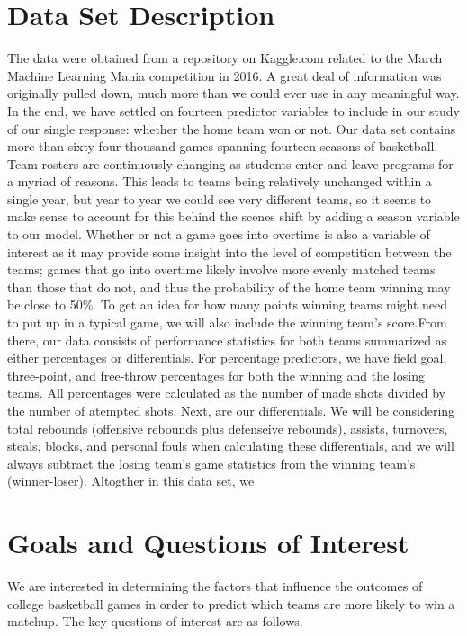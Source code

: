 \documentclass[12pt]{article}\usepackage[]{graphicx}\usepackage[]{color}
\begin{document}
\section{Data Set Description}
The data were obtained from a repository on Kaggle.com related to the March Machine Learning Mania competition in 2016. A great deal of information was originally pulled down, much more than we could ever use in any meaningful way. In the end, we have settled on fourteen predictor variables to include in our study of our single response: whether the home team won or not. Our data set contains more than sixty-four thousand games spanning fourteen seasons of basketball. Team rosters are continuously changing as students enter and leave programs for a myriad of reasons. This leads to teams being relatively unchanged within a single year, but year to year we could see very different teams, so it seems to make sense to account for this behind the scenes shift by adding a season variable to our model. Whether or not a game goes into overtime is also a variable of interest as it may provide some insight into the level of competition between the teams; games that go into overtime likely involve more evenly matched teams than those that do not, and thus the probability of the home team winning may be close to 50\%. To get an idea for how many points winning teams might need to put up in a typical game, we will also include the winning team's score.From there, our data consists of performance statistics for both teams summarized as either percentages or differentials. For percentage predictors, we have field goal, three-point, and free-throw percentages for both the winning and the losing teams. All percentages were calculated as the number of made shots divided by the number of atempted shots. Next, are our differentials. We will be considering total rebounds (offensive rebounds plus defenseive rebounds), assists, turnovers, steals, blocks, and personal fouls when calculating these differentials, and we will always subtract the losing team's game statistics from the winning team's (winner-loser). Altogther in this data set, we

\section{Goals and Questions of Interest}
We are interested in determining the factors that influence the outcomes of college basketball games in order to predict which teams are more likely to win a matchup. The key questions of interest are as follows.
\end{document}
